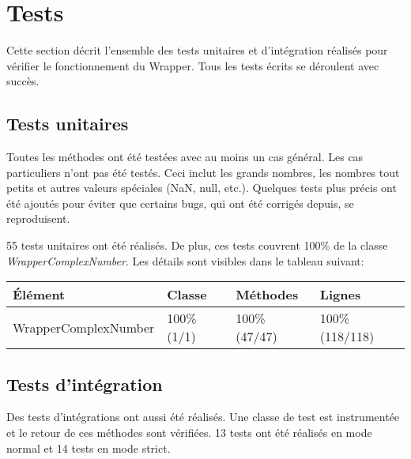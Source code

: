 \section{Tests}

Cette section décrit l'ensemble des tests unitaires et d'intégration réalisés pour vérifier le fonctionnement du \gls{Wrapper}. Tous les tests écrits se déroulent avec succès.

\subsection{Tests unitaires}

Toutes les méthodes ont été testées avec au moins un cas général. Les cas particuliers n'ont pas été testés. Ceci inclut les grands nombres, les nombres tout petits et autres valeurs spéciales (NaN, null, etc.). Quelques tests plus précis ont été ajoutés pour éviter que certains bugs, qui ont été corrigés depuis, se reproduisent.

55 tests unitaires ont été réalisés. De plus, ces tests couvrent 100\% de la classe \textit{WrapperComplexNumber}. Les détails sont visibles dans le tableau suivant:

\begin{table}[h]
    \begin{tabularx}{\columnwidth}{ | p{12em} | X | X | X |}
        \hline
        \textbf{Élément} & \textbf{Classe} & \textbf{Méthodes} & \textbf{Lignes} \\
        \hline
        WrapperComplexNumber & 100\% (1/1) & 100\% (47/47) & 100\% (118/118) \\
        \hline
    \end{tabularx}
\end{table}

\subsection{Tests d'intégration}

Des tests d'intégrations ont aussi été réalisés. Une classe de test est instrumentée et le retour de ces méthodes sont vérifiées. 13 tests ont été réalisés en mode normal et 14 tests en mode strict.
